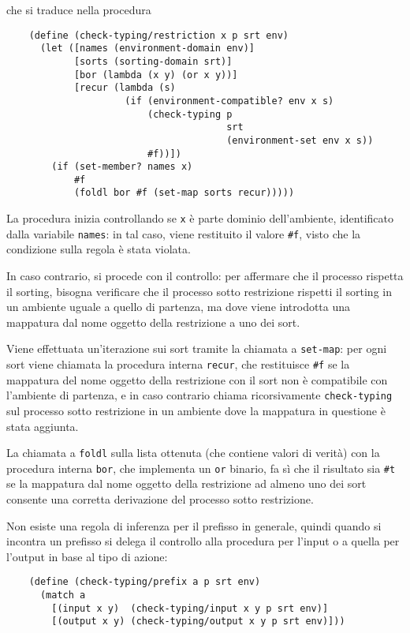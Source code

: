 che si traduce nella procedura

\begin{lstlisting}
    (define (check-typing/restriction x p srt env)
      (let ([names (environment-domain env)]
            [sorts (sorting-domain srt)]
            [bor (lambda (x y) (or x y))]
            [recur (lambda (s)
                     (if (environment-compatible? env x s)
                         (check-typing p
                                       srt
                                       (environment-set env x s))
                         #f))])
        (if (set-member? names x)
            #f
            (foldl bor #f (set-map sorts recur)))))
\end{lstlisting}

La procedura inizia controllando se \lstinline{x} \`e parte dominio
dell'ambiente, identificato dalla variabile \lstinline{names}: in tal
caso, viene restituito il valore \lstinline{#f}, visto che la condizione
sulla regola \`e stata violata.

In caso contrario, si procede con il controllo: per affermare che il
processo rispetta il sorting, bisogna verificare che il processo sotto
restrizione rispetti il sorting in un ambiente uguale a quello di
partenza, ma dove viene introdotta una mappatura dal nome oggetto
della restrizione a uno dei sort.

Viene effettuata un'iterazione sui sort tramite la chiamata a
\lstinline{set-map}: per ogni sort viene chiamata la procedura
interna \lstinline{recur}, che restituisce \lstinline{#f} se la
mappatura del nome oggetto della restrizione con il sort non \`e
compatibile con l'ambiente di partenza, e in caso contrario chiama
ricorsivamente \lstinline{check-typing} sul processo sotto restrizione
in un ambiente dove la mappatura in questione \`e stata aggiunta.

La chiamata a \lstinline{foldl} sulla lista ottenuta (che contiene
valori di verit\`a) con la procedura interna \lstinline{bor}, che
implementa un \lstinline{or} binario, fa s\`i che il risultato sia
\lstinline{#t} se la mappatura dal nome oggetto della restrizione ad
almeno uno dei sort consente una corretta derivazione del processo
sotto restrizione.

Non esiste una regola di inferenza per il prefisso in generale, quindi
quando si incontra un prefisso si delega il controllo alla procedura
per l'input o a quella per l'output in base al tipo di azione:

\begin{lstlisting}
    (define (check-typing/prefix a p srt env)
      (match a
        [(input x y)  (check-typing/input x y p srt env)]
        [(output x y) (check-typing/output x y p srt env)]))
\end{lstlisting}

